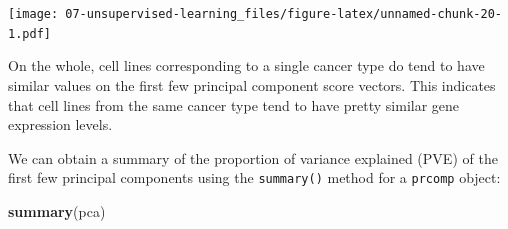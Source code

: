\documentclass[openany]{book}
\newenvironment{Shaded}{\begin{snugshade}}{\end{snugshade}}
\newcommand{\KeywordTok}[1]{\textcolor[rgb]{0.13,0.29,0.53}{\textbf{#1}}}
\newcommand{\NormalTok}[1]{#1}
\begin{document}
\texttt{[image: 07-unsupervised-learning\_files/figure-latex/unnamed-chunk-20-1.pdf]}

On the whole, cell lines corresponding to a single cancer type do tend to have similar values on the
first few principal component score vectors. This indicates that cell lines
from the same cancer type tend to have pretty similar gene expression
levels.

We can obtain a summary of the proportion of variance explained (PVE)
of the first few principal components using the \texttt{summary()} method for a
\texttt{prcomp} object:

\begin{Shaded}
\begin{Highlighting}[]
\KeywordTok{summary}\NormalTok{(pca)}
\end{Highlighting}
\end{Shaded}
\end{document}
